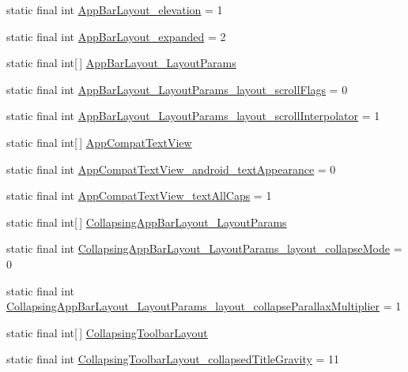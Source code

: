 \begin{DoxyCompactItemize}
static final int \hyperlink{classcheck_1_1test_1_1_r_1_1styleable_ab651c6ae78f517b87aa0dd36e0c75dbd}{App\+Bar\+Layout\+\_\+elevation} = 1
\item 
static final int \hyperlink{classcheck_1_1test_1_1_r_1_1styleable_a72cf6dabc14227ec4824c24626692296}{App\+Bar\+Layout\+\_\+expanded} = 2
\item 
static final int\mbox{[}$\,$\mbox{]} \hyperlink{classcheck_1_1test_1_1_r_1_1styleable_adbe27e505a2c53030b9f1cc91b81a452}{App\+Bar\+Layout\+\_\+\+Layout\+Params}
\item 
static final int \hyperlink{classcheck_1_1test_1_1_r_1_1styleable_a9b9cef87b7b8a51d20c37c2a13fb320a}{App\+Bar\+Layout\+\_\+\+Layout\+Params\+\_\+layout\+\_\+scroll\+Flags} = 0
\item 
static final int \hyperlink{classcheck_1_1test_1_1_r_1_1styleable_a8466df23f54f293c6b7257f630ad0862}{App\+Bar\+Layout\+\_\+\+Layout\+Params\+\_\+layout\+\_\+scroll\+Interpolator} = 1
\item 
static final int\mbox{[}$\,$\mbox{]} \hyperlink{classcheck_1_1test_1_1_r_1_1styleable_a07bf5a828a4906262f29b961bc851581}{App\+Compat\+Text\+View}
\item 
static final int \hyperlink{classcheck_1_1test_1_1_r_1_1styleable_aa7f15943a9e9325a18e9aca717b54afe}{App\+Compat\+Text\+View\+\_\+android\+\_\+text\+Appearance} = 0
\item 
static final int \hyperlink{classcheck_1_1test_1_1_r_1_1styleable_aafcec9edff038010ef0a530321a8dea1}{App\+Compat\+Text\+View\+\_\+text\+All\+Caps} = 1
\item 
static final int\mbox{[}$\,$\mbox{]} \hyperlink{classcheck_1_1test_1_1_r_1_1styleable_a7e768556a62ed1c95f1a007062d82336}{Collapsing\+App\+Bar\+Layout\+\_\+\+Layout\+Params}
\item 
static final int \hyperlink{classcheck_1_1test_1_1_r_1_1styleable_a577fe4be59c703b28ed8e21615998682}{Collapsing\+App\+Bar\+Layout\+\_\+\+Layout\+Params\+\_\+layout\+\_\+collapse\+Mode} = 0
\item 
static final int \hyperlink{classcheck_1_1test_1_1_r_1_1styleable_ad6ae36504d3df9470ea2d28988011185}{Collapsing\+App\+Bar\+Layout\+\_\+\+Layout\+Params\+\_\+layout\+\_\+collapse\+Parallax\+Multiplier} = 1
\item 
static final int\mbox{[}$\,$\mbox{]} \hyperlink{classcheck_1_1test_1_1_r_1_1styleable_a0c512120c75d0ddac20063034a72db17}{Collapsing\+Toolbar\+Layout}
\item 
static final int \hyperlink{classcheck_1_1test_1_1_r_1_1styleable_ad728b1cdc0cf8cb71ec337342515dd75}{Collapsing\+Toolbar\+Layout\+\_\+collapsed\+Title\+Gravity} = 11

\end{DoxyCompactItemize}
